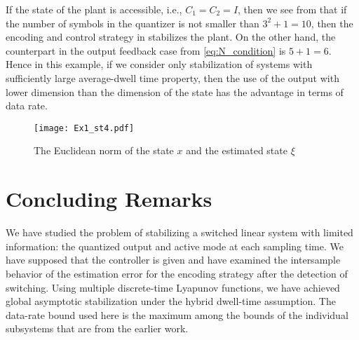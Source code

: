 \documentclass[letterpaper, 11pt, onecolumn]{ieeeconf}  \IEEEoverridecommandlockouts
\begin{document}
If the state of the plant is accessible, i.e., $C_1 = C_2 = I$, then we see from 
\cite[Assumption 3]{Liberzon2014} that if the number of symbols in the 
quantizer is not smaller than $3^2+1 = 10$, then 
the encoding and control strategy in \cite{Liberzon2014}
stabilizes the plant.
On the other hand, the counterpart in the output feedback case from
\eqref{eq:N_condition} is $5+1 = 6$.
Hence in this example, if we consider only stabilization
of systems with sufficiently large average-dwell time property, then 
the use of the output with lower dimension than the dimension of the state
has the advantage in terms of data rate.
 \begin{figure}[t]
 \centering
 \texttt{[image: Ex1\_st4.pdf]}
 \caption{The Euclidean norm of the state $x$ and the estimated state $\xi$}
 \label{fig:simulation}
 \end{figure}




\section{Concluding Remarks}
We have studied the problem of stabilizing 
a switched linear system with limited information: 
the quantized output and active mode at each sampling time.
We have supposed that the controller is given
and have examined the intersample behavior of the estimation error
for the encoding strategy after the detection of switching.
Using multiple discrete-time Lyapunov functions, we have achieved
global asymptotic stabilization under
the hybrid dwell-time assumption.
The data-rate bound used here is
the maximum among the bounds of the individual subsystems
that are from the earlier work. 
\end{document}
